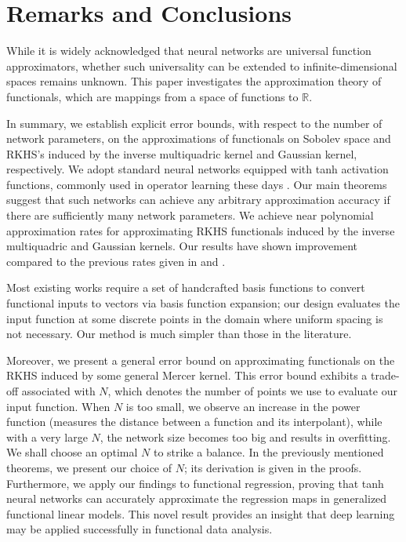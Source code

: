\documentclass{article}
\def\RR{\mathbb R}
\numberwithin{equation}{section}
\begin{document}
\section{Remarks and Conclusions}\label{sec:conclusion}
While it is widely acknowledged that neural networks are universal function approximators, whether such universality can be extended to infinite-dimensional spaces remains unknown. This paper investigates the approximation theory of functionals, which are mappings from a space of functions to $\RR$.

In summary, we establish explicit error bounds, with respect to the number of network parameters, on the approximations of functionals on Sobolev space and RKHS's induced by the inverse multiquadric kernel and Gaussian kernel, respectively. 
We adopt standard neural networks equipped with tanh activation functions, commonly used in operator learning these days \citep{lu2021learning, wang2021learning}. 
Our main theorems suggest that such networks can achieve any arbitrary approximation accuracy if there are sufficiently many network parameters. 
We achieve near polynomial approximation rates for approximating RKHS functionals induced by the inverse multiquadric and Gaussian kernels. 
Our results have shown improvement compared to the previous rates given in \citep{mhaskar1997neural} and \citep{song2023approximationarxiv}.

Most existing works \citep{rossi2005functional, song2023approximationarxiv} require a set of handcrafted basis functions to convert functional inputs to vectors via basis function expansion; our design evaluates the input function at some discrete points in the domain where uniform spacing is not necessary. 
Our method is much simpler than those in the literature. 

Moreover, we present a general error bound on approximating functionals on the RKHS induced by some general Mercer kernel. This error bound exhibits a trade-off associated with $N$, which denotes the number of points we use to evaluate our input function. 
When $N$ is too small, we observe an increase in the power function (measures the distance between a function and its interpolant), while with a very large $N$, the network size becomes too big and results in overfitting. 
We shall choose an optimal $N$ to strike a balance.
In the previously mentioned theorems, we present our choice of $N$;  its derivation is given in the proofs. 
Furthermore, we apply our findings to functional regression, proving that tanh neural networks can accurately approximate the regression maps in generalized functional linear models. 
This novel result provides an insight that deep learning may be applied successfully in functional data analysis. 
\end{document}

